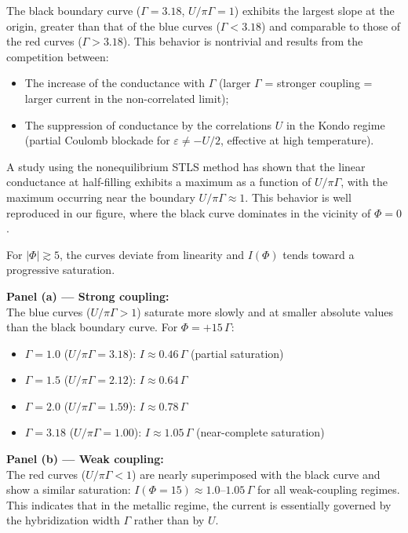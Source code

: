 \documentclass[preprint,1p]{elsarticle}
\begin{document}
The black boundary curve ($\Gamma = 3.18$, $U/\pi\Gamma = 1$)
exhibits the largest slope at the origin,
greater than that of the blue curves ($\Gamma < 3.18$)
and comparable to those of the red curves ($\Gamma > 3.18$).
This behavior is nontrivial and results from the competition
between:
\begin{itemize}
	\item The increase of the conductance with $\Gamma$
	(larger $\Gamma$ = stronger coupling = larger current
	in the non-correlated limit);
	\item The suppression of conductance by the correlations $U$
	in the Kondo regime (partial Coulomb blockade for
	$\varepsilon \neq -U/2$, effective at high temperature).
\end{itemize}

A study using the nonequilibrium STLS method has shown that the linear conductance at half-filling exhibits a maximum as a function of $U/\pi\Gamma$, with the maximum occurring near the boundary $U/\pi\Gamma \approx 1$. This behavior is well reproduced in our figure, where the black curve dominates in the vicinity of $\Phi = 0$.

For $|\Phi| \gtrsim 5$, the curves deviate from linearity
and $I(\Phi)$ tends toward a progressive saturation.

\textbf{Panel (a) --- Strong coupling:}
\\
The blue curves ($U/\pi\Gamma > 1$) saturate more slowly and at
smaller absolute values than the black boundary curve.
For $\Phi = +15\,\Gamma$:
\begin{itemize}
	\item $\Gamma = 1.0$ ($U/\pi\Gamma = 3.18$):
	$I \approx 0.46\,\Gamma$ \quad (partial saturation)
	\item $\Gamma = 1.5$ ($U/\pi\Gamma = 2.12$):
	$I \approx 0.64\,\Gamma$
	\item $\Gamma = 2.0$ ($U/\pi\Gamma = 1.59$):
	$I \approx 0.78\,\Gamma$
	\item $\Gamma = 3.18$ ($U/\pi\Gamma = 1.00$):
	$I \approx 1.05\,\Gamma$ \quad (near-complete saturation)
\end{itemize}

\textbf{Panel (b) --- Weak coupling:}
\\
The red curves ($U/\pi\Gamma < 1$) are nearly superimposed
with the black curve and show a similar saturation:
$I(\Phi=15) \approx 1.0\text{--}1.05\,\Gamma$ for all weak-coupling
regimes. This indicates that in the metallic regime,
the current is essentially governed by the hybridization width
$\Gamma$ rather than by $U$.
\end{document}

